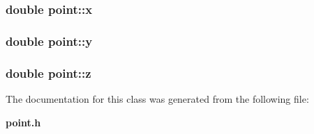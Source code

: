 \subsubsection[{x}]{\setlength{\rightskip}{0pt plus 5cm}double {\bf point::x}}\label{classpoint_9c6b34deaf4900ad4193c17935fd384a}


\subsubsection[{y}]{\setlength{\rightskip}{0pt plus 5cm}double {\bf point::y}}\label{classpoint_613f8f0d7352731638b0094e1b958b87}


\subsubsection[{z}]{\setlength{\rightskip}{0pt plus 5cm}double {\bf point::z}}\label{classpoint_ab1f0c3682401083b5bf252e7001874f}




The documentation for this class was generated from the following file:\begin{CompactItemize}
\item 
{\bf point.h}\end{CompactItemize}
